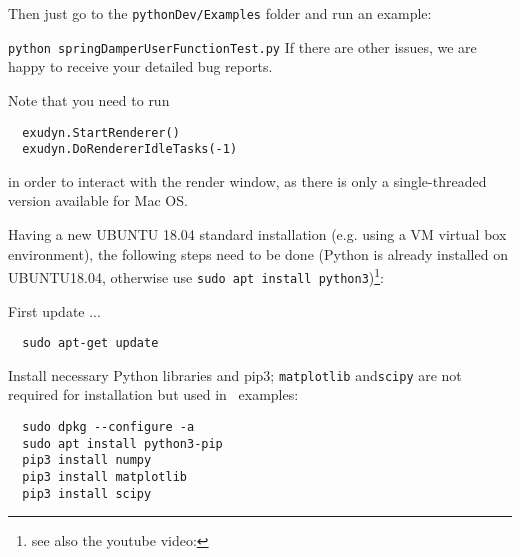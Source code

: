\ei
Then just go to the \texttt{pythonDev/Examples} folder and run an example:
\bi
  \item[] \texttt{python springDamperUserFunctionTest.py}
\ei
If there are other issues, we are happy to receive your detailed bug reports. 

\noindent Note that you need to run 
\pythonstyle\begin{lstlisting}
  exudyn.StartRenderer()
  exudyn.DoRendererIdleTasks(-1)
\end{lstlisting}
in order to interact with the render window, as there is only a single-threaded version available for Mac OS.

%
Having a new UBUNTU 18.04 standard installation (e.g. using a VM virtual box environment), the following steps need to be done (Python  is already installed on UBUNTU18.04, otherwise use \texttt{sudo apt install python3})\footnote{see also the youtube video: }:

\noindent First update ...
\plainlststyle
\begin{lstlisting}
  sudo apt-get update
\end{lstlisting}

\noindent 
Install necessary Python libraries and pip3; \texttt{matplotlib} and\texttt{scipy} are not required for installation but used in \codeName\ examples:
\begin{lstlisting}
  sudo dpkg --configure -a
  sudo apt install python3-pip
  pip3 install numpy
  pip3 install matplotlib
  pip3 install scipy
\end{lstlisting}

